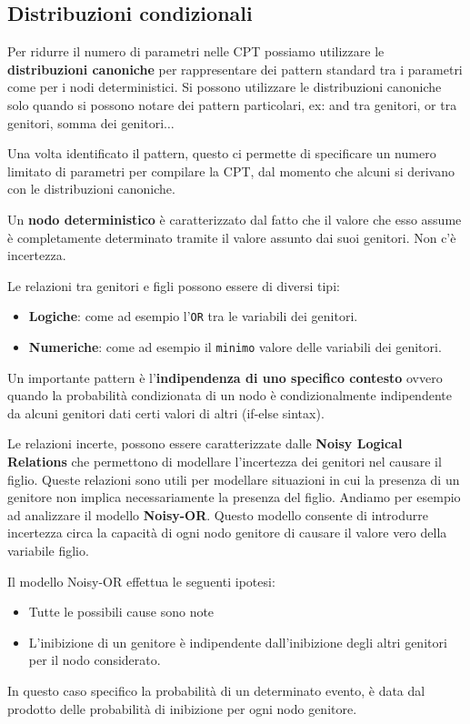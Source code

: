 \subsection{Distribuzioni condizionali}
Per ridurre il numero di parametri nelle CPT possiamo utilizzare le \textbf{distribuzioni
    canoniche} per rappresentare dei pattern standard tra i parametri come per
i nodi deterministici. Si possono utilizzare le distribuzioni canoniche solo
quando si possono notare dei pattern particolari, ex: and tra genitori, or tra
genitori, somma dei genitori$\dots$

Una volta identificato il pattern, questo ci permette di specificare un numero
limitato di parametri per compilare la CPT, dal momento che alcuni si derivano
con le distribuzioni canoniche.
\begin{definizione}
    Un \textbf{nodo deterministico} è caratterizzato dal fatto che il valore che
    esso assume è completamente determinato tramite il valore assunto dai suoi
    genitori. Non c'è incertezza.
\end{definizione}
Le relazioni tra genitori e figli possono essere di diversi tipi:
\begin{itemize}
    \item \textbf{Logiche}: come ad esempio l'\texttt{OR} tra le variabili dei genitori.
    \item \textbf{Numeriche}: come ad esempio il \texttt{minimo} valore delle
          variabili dei genitori.
\end{itemize}
Un importante pattern è l'\textbf{indipendenza di uno specifico contesto} ovvero
quando la probabilità condizionata di un nodo è condizionalmente indipendente
da alcuni genitori dati certi valori di altri (if-else sintax).

Le relazioni incerte, possono essere caratterizzate dalle \textbf{Noisy Logical
    Relations} che permettono di modellare l'incertezza dei genitori nel causare
il figlio. Queste relazioni sono utili per modellare situazioni in cui la presenza
di un genitore non implica necessariamente la presenza del figlio.
Andiamo per esempio ad analizzare il modello \textbf{Noisy-OR}. Questo modello
consente di introdurre incertezza circa la capacità di ogni nodo genitore di
causare il valore vero della variabile figlio.

Il modello Noisy-OR effettua le seguenti ipotesi:
\begin{itemize}
    \item Tutte le possibili cause sono note
    \item L'inibizione di un genitore è indipendente dall'inibizione degli altri
          genitori per il nodo considerato.
\end{itemize}
In questo caso specifico la probabilità di un determinato evento, è data dal
prodotto delle probabilità di inibizione per ogni nodo genitore.
